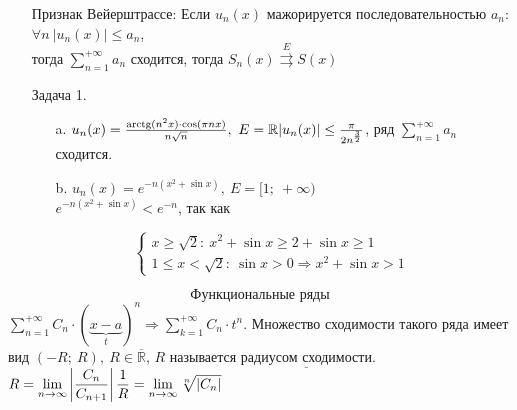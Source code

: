 \documentclass[12pt, letterpaper, twoside]{article}
\newcommand{\Underl}[1]{$\underline{\text{#1}}$}
\newcommand{\DS}{\displaystyle}
\newcommand{\oo}{\infty}
\newcommand{\arctg}{\operatorname{arctg}}
\newcommand{\Abs}[1]{\left| #1 \right|}
\begin{document}
    \begin{enumerate}
        \item[Признак Вейерштрассе:] Если $u_n(x)$ мажорируется последовательностью $a_n$: $\forall n\ |u_n(x)| \leq a_n$,\\
        тогда $\DS \sum_{n = 1}^{+\oo}a_n$ сходится, тогда $S_n(x) \overset{E}{\rightrightarrows} S(x)$ 
        \item[Задача 1.]
        \begin{enumerate}
            \item[a.] $u_n(x) = \frac{\arctg(n^2 x)\cdot \cos(\pi n x)}{n\sqrt{n}},\ E=\mathbb{R}\\
            |u_n(x)| \leq \frac{\pi}{2n^{\frac{3}{2}}}$, ряд $\DS \sum_{n = 1}^{+\oo}a_n$ сходится.\newpage
            \item[b.] $u_n(x) = e^{-n(x^2 + \sin x)},\ E = [1;\ +\oo)$\\
            $e^{-n(x^2 + \sin x)} < e^{-n}$, так как
        \end{enumerate}
            \[\begin{cases}
                x \geq \sqrt{2}:\ x^2 + \sin x \geq 2 + \sin x \geq 1\\
                1 \leq x < \sqrt{2}:\ \sin x > 0 \Rightarrow x^2 + \sin x > 1
            \end{cases}\]
    \end{enumerate}
    \[\text{Функциональные ряды}\]
    $\DS \sum_{n = 1}^{+\oo} C_n\cdot (\underset{t}{\underbrace{x - a}})^n \Rightarrow \sum_{k = 1}^{+\oo} C_n\cdot t^n$. Множество сходимости такого ряда имеет вид $(-R;\ R),\ R\in \overline{\mathbb{R}}$, $R$ называется \Underl{радиусом сходимости}.\\
    $R = \DS\lim_{n\rightarrow\oo} \Abs{\frac{C_n}{C_{n + 1}}}\\
    \frac{1}{R} = \lim_{n\rightarrow \oo} \sqrt[n]{|C_n|}$
\end{document}
